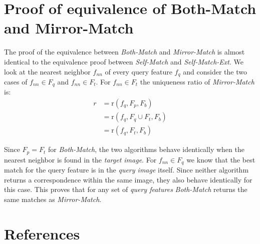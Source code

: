 \documentclass[review]{elsarticle}
\begin{document}
\section{Proof of equivalence of Both-Match and Mirror-Match}
\label{A:mirror}

The proof of the equivalence between \emph{Both-Match} and \emph{Mirror-Match} is almost identical to the equivalence proof between \emph{Self-Match} and \emph{Self-Match-Ext}. We look at the nearest neighbor $f_{nn}$ of every query feature $f_{q}$ and consider the two cases of $f_{nn} \in F_{q}$ and $f_{nn} \in F_{t}$. For $f_{nn} \in F_{t}$ the uniqueness ratio of \emph{Mirror-Match} is:
\begin{align*}
    r &= \text{r}(f_{q}, F_{p}, F_{b}) \\
        &= \text{r}(f_{q}, F_{q} \cup F_{t}, F_{b})\\
        &= \text{r}(f_{q}, F_{t}, F_{b})
\end{align*}

Since $F_{p} = F_{t}$ for \emph{Both-Match}, the two algorithms behave identically when the nearest neighbor is found in the \emph{target image}. For $f_{nn} \in F_{q}$ we know that the best match for the query feature is in the \emph{query image} itself. Since neither algorithm returns a correspondence within the same image, they also behave identically for this case. This proves that for any set of \emph{query features} \emph{Both-Match} returns the same matches as \emph{Mirror-Match}.

\balance

\section*{References}


\end{document}
